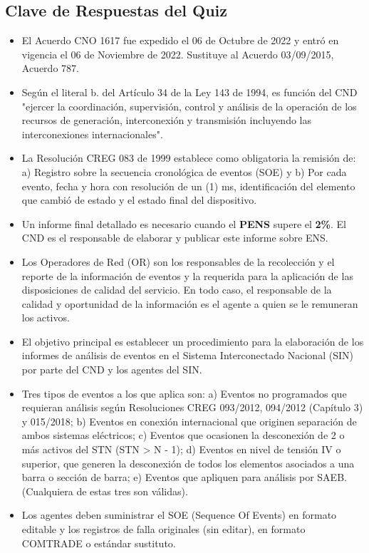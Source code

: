 \documentclass[a5paper]{book}%
\begin{document}
\subsection{Clave de Respuestas del Quiz}

\begin{itemize}
	
	\item El Acuerdo CNO 1617 fue expedido el 06 de Octubre de 2022 y entró en vigencia el 06 de Noviembre de 2022. Sustituye al Acuerdo 03/09/2015, Acuerdo 787.
	\item Según el literal b. del Artículo 34 de la Ley 143 de 1994, es función del CND "ejercer la coordinación, supervisión, control y análisis de la operación de los recursos de generación, interconexión y transmisión incluyendo las interconexiones internacionales".
	\item La Resolución CREG 083 de 1999 establece como obligatoria la remisión de: a) Registro sobre la secuencia cronológica de eventos (SOE) y b) Por cada evento, fecha y hora con resolución de un (1) ms, identificación del elemento que cambió de estado y el estado final del dispositivo.
	\item Un informe final detallado es necesario cuando el \textbf{PENS} supere el \textbf{2\%}. El CND es el responsable de elaborar y publicar este informe sobre \ac{ENS}.
	\item Los Operadores de Red (OR) son los responsables de la recolección y el reporte de la información de eventos y la requerida para la aplicación de las disposiciones de calidad del servicio. En todo caso, el responsable de la calidad y oportunidad de la información es el agente a quien se le remuneran los activos.
	\item El objetivo principal es establecer un procedimiento para la elaboración de los informes de análisis de eventos en el Sistema Interconectado Nacional (SIN) por parte del CND y los agentes del SIN.
	\item Tres tipos de eventos a los que aplica son: a) Eventos no programados que requieran análisis según Resoluciones CREG 093/2012, 094/2012 (Capítulo 3) y 015/2018; b) Eventos en conexión internacional que originen separación de ambos sistemas eléctricos; c) Eventos que ocasionen la desconexión de 2 o más activos del STN (STN > N - 1); d) Eventos en nivel de tensión IV o superior, que generen la desconexión de todos los elementos asociados a una barra o sección de barra; e) Eventos que apliquen para análisis por SAEB. (Cualquiera de estas tres son válidas).
	\item Los agentes deben suministrar el SOE (Sequence Of Events) en formato editable y los registros de falla originales (sin editar), en formato COMTRADE o estándar sustituto.

\end{itemize}
\end{document}
